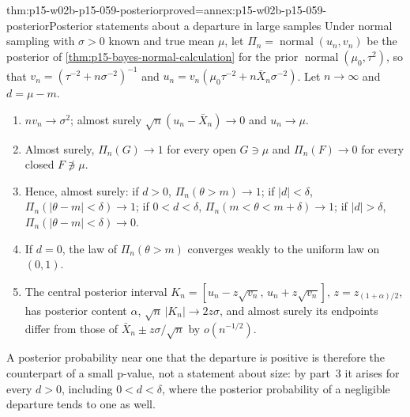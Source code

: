 \begin{hbtheorem}{thm:p15-w02b-p15-059-posterior}{proved=annex:p15-w02b-p15-059-posterior}{Posterior statements about a departure in large samples}
Under normal sampling with \(\sigma>0\) known and true mean \(\mu\), let
\(\Pi_n=\operatorname{normal}(u_n,v_n)\) be the posterior of
\cref{thm:p15-bayes-normal-calculation} for the prior
\(\operatorname{normal}(\mu_0,\tau^2)\), so that
\(v_n=(\tau^{-2}+n\sigma^{-2})^{-1}\) and
\(u_n=v_n(\mu_0\tau^{-2}+n\bar X_n\sigma^{-2})\). Let \(n\to\infty\) and
\(d=\mu-m\).
\begin{enumerate}
\item \(nv_n\to\sigma^2\); almost surely \(\sqrt n(u_n-\bar X_n)\to0\) and
\(u_n\to\mu\).
\item Almost surely, \(\Pi_n(G)\to1\) for every open \(G\ni\mu\) and
\(\Pi_n(F)\to0\) for every closed \(F\not\ni\mu\).
\item Hence, almost surely: if \(d>0\), \(\Pi_n(\theta>m)\to1\); if
\(|d|<\delta\), \(\Pi_n(|\theta-m|<\delta)\to1\); if \(0<d<\delta\),
\(\Pi_n(m<\theta<m+\delta)\to1\); if \(|d|>\delta\),
\(\Pi_n(|\theta-m|<\delta)\to0\).
\item If \(d=0\), the law of \(\Pi_n(\theta>m)\) converges weakly to the
uniform law on \((0,1)\).
\item The central posterior interval
\(K_n=[u_n-z\sqrt{v_n},\,u_n+z\sqrt{v_n}]\), \(z=z_{(1+\alpha)/2}\), has
posterior content \(\alpha\), \(\sqrt n\,|K_n|\to2z\sigma\), and almost
surely its endpoints differ from those of
\(\bar X_n\pm z\sigma/\sqrt n\) by \(o(n^{-1/2})\).
\end{enumerate}
\end{hbtheorem}

A posterior probability near one that the departure is positive is therefore
the counterpart of a small p-value, not a statement about size: by
part~3 it arises for every \(d>0\), including \(0<d<\delta\), where the
posterior probability of a negligible departure tends to one as well.

